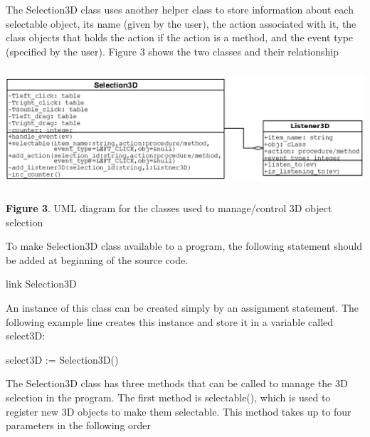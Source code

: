 \documentclass[letterpaper]{article}
\begin{document}
{\bigskip


\bigskip


\bigskip

{
The \textsf{Selection3D} class uses another helper class to store information about each selectable object, its name
(given by the user), the action associated with it, the class objects that holds the action if the action is a method,
and the event type (specified by the user). Figure 3 shows the two classes and their relationship}


\bigskip



\begin{center}
\includegraphics[width=6in,height=1.75in]{utr9/utr9-img035.png}
\end{center}
\begin{center}
\begin{minipage}{5.1264in}
{
\textbf{Figure 3}. UML diagram for the classes used to manage/control 3D object selection}
\end{minipage}
\end{center}

\bigskip

{
To make Selection3D class available to a program, the following statement should be added at beginning of the source
code.}


\bigskip

{\sffamily
link Selection3D}


\bigskip

{
An instance of this class can be created simply by an assignment statement. The following example line creates this
instance and store it in a variable called \textsf{select3D:}}


\bigskip

{\sffamily
select3D := Selection3D()}


\bigskip

{
The \textsf{Selection3D} class has three methods that can be called to manage the 3D selection in the program. The first
method is \textsf{selectable()}, which is used to register new 3D objects to make them selectable. This method takes up
to four parameters in the following order}


}
\end{document}
